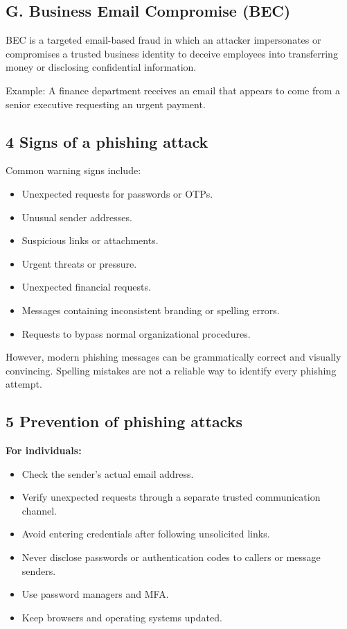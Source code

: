 \subsection{G. Business Email Compromise (BEC)}

BEC is a targeted email-based fraud in which an attacker impersonates or compromises a trusted business identity to deceive employees into transferring money or disclosing confidential information.

Example: A finance department receives an email that appears to come from a senior executive requesting an urgent payment.

\subsection{4 Signs of a phishing attack}

Common warning signs include:

\begin{itemize}
\item Unexpected requests for passwords or OTPs.
\item Unusual sender addresses.
\item Suspicious links or attachments.
\item Urgent threats or pressure.
\item Unexpected financial requests.
\item Messages containing inconsistent branding or spelling errors.
\item Requests to bypass normal organizational procedures.
\end{itemize}

However, modern phishing messages can be grammatically correct and visually convincing. Spelling mistakes are not a reliable way to identify every phishing attempt.

\subsection{5 Prevention of phishing attacks}

\textbf{For individuals:}

\begin{itemize}
\item Check the sender's actual email address.
\item Verify unexpected requests through a separate trusted communication channel.
\item Avoid entering credentials after following unsolicited links.
\item Never disclose passwords or authentication codes to callers or message senders.
\item Use password managers and MFA.
\item Keep browsers and operating systems updated.
\end{itemize}

